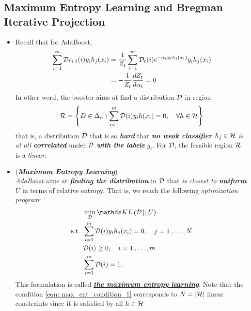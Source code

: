 \documentclass[11pt]{article}
\begin{document}
\subsection{Maximum Entropy Learning and Bregman Iterative Projection}
\begin{itemize}
\item \begin{remark}
Recall that for AdaBoost, 
\begin{align*}
\sum_{i=1}^{m}{\mathcal D}_{t+1}(i)y_i h_j(x_i) &= \frac{1}{Z_t}\sum_{i=1}^{m}{\mathcal D}_{t}(i) e^{-\alpha_t y_i h_j(x_i) } y_i h_j(x_i) \\
&= -  \frac{1}{Z_t} \frac{d Z_t}{d \alpha_t} = 0
\end{align*} In other word, the booster aims at find a distribution ${\mathcal D}$ in region
\begin{align}
{\mathcal R} = \left\{D \in \Delta_{n}: \sum_{i=1}^{m}{\mathcal D}(i)y_i h(x_i) = 0, \quad \forall h \in {\mathcal H}\right\} \label{def: feasible_region_max_ent}
\end{align} that is, a distribution ${\mathcal D}$ that is so \emph{\textbf{hard}} that \emph{\textbf{no weak classifier} $h_j \in {\mathcal H}$ is at all \textbf{correlated}} under ${\mathcal D}$ \emph{\textbf{with the labels}} $y_i$. For ${\mathcal D}$, the feasible region ${\mathcal R}$ is a \emph{linear}.
\end{remark}

\item \begin{remark}(\textbf{\emph{Maximum Entropy Learning}})\\
\emph{AdaBoost} aims at \emph{\textbf{finding the distribution}} in ${\mathcal D}$ that \emph{is closest to \textbf{uniform}} $U$ in terms of relative entropy. That is, we reach the following \emph{optimization program}:
\begin{align}
&\min_{\cD} \kl{\cD}{U} \label{eqn: max_ent_boost}\\
\text{s.t. }& \sum_{i=1}^{m}\cD(i)y_i h_j(x_i) = 0, \quad j=1 \xdotx{,} N \label{eqn: max_ent_condition_1}\\
&\cD(i) \ge 0, \quad i=1 \xdotx{,} m \nonumber\\
&\sum_{i=1}^{m}\cD(i) = 1. \nonumber
\end{align} This formulation is called \underline{\emph{\textbf{the maximum entropy learning}}}. Note that the condition \eqref{eqn: max_ent_condition_1} corresponds to $N = \left\lvert {\mathcal H} \right\rvert$ linear constraints since it is satisfied by all $h \in {\mathcal H}$ 
\end{remark}




\end{itemize}
\end{document}
